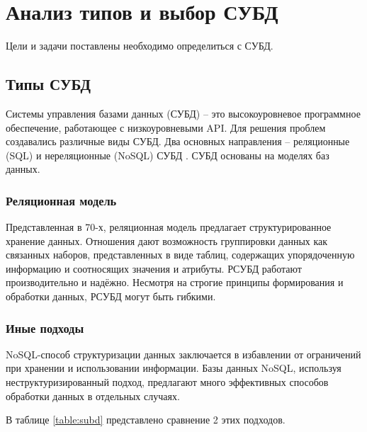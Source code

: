 \section{\textbf{Анализ типов и выбор СУБД}}

Цели и задачи поставлены необходимо определиться с СУБД. 

\subsection{\textbf{Типы СУБД}}

Системы управления базами данных (СУБД) -- это высокоуровневое программное обеспечение, работающее с низкоуровневыми API. Для решения проблем создавались различные виды СУБД. Два основных направления -- реляционные (SQL) и нереляционные (NoSQL) СУБД \cite{nosql}. СУБД основаны на моделях баз данных. 

\subsubsection{\textbf{Реляционная модель}}

Представленная в 70-х, реляционная модель предлагает структурированное хранение данных. Отношения дают возможность группировки данных как связанных наборов, представленных в виде таблиц, содержащих упорядоченную информацию и соотносящих значения и атрибуты. РСУБД работают производительно и надёжно. Несмотря на строгие принципы формирования и обработки данных, РСУБД могут быть гибкими.

\subsubsection{\textbf{Иные подходы}}

NoSQL-способ структуризации данных заключается в избавлении от ограничений при хранении и использовании информации. Базы данных NoSQL, используя неструктуризированный подход, предлагают много эффективных способов обработки данных в отдельных случаях. 

В таблице \ref{table:subd} представлено сравнение 2 этих подходов. 

